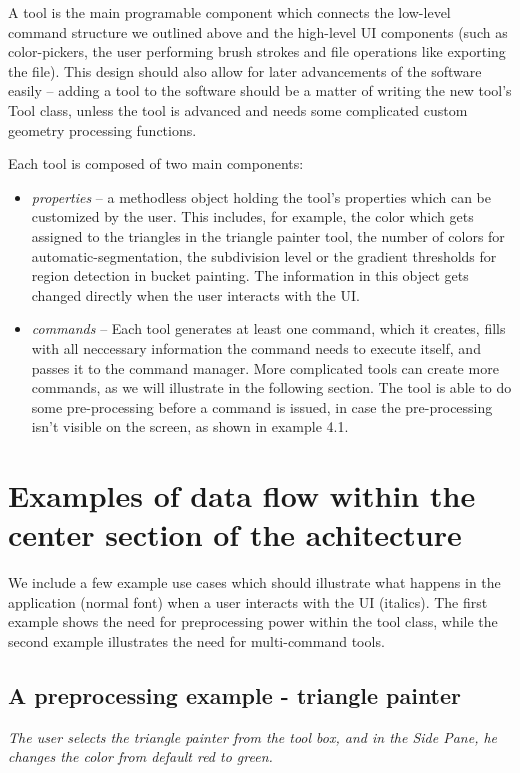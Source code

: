 A tool is the main programable component which connects the low-level command structure we outlined above and the high-level UI components (such as color-pickers, the user performing brush strokes and file operations like exporting the file). This design should also allow for later advancements of the software easily -- adding a tool to the software should be a matter of writing the new tool's Tool class, unless the tool is advanced and needs some complicated custom geometry processing functions.

\medskip

Each tool is composed of two main components:
\begin{itemize}
\item \textit{properties} -- a methodless object holding the tool's properties which can be customized by the user. This includes, for example, the color which gets assigned to the triangles in the triangle painter tool, the number of colors for automatic-segmentation, the subdivision level or the gradient thresholds for region detection in bucket painting. The information in this object gets changed directly when the user interacts with the UI.

\item \textit{commands} -- Each tool generates at least one command, which it creates, fills with all neccessary information the command needs to execute itself, and passes it to the command manager. More complicated tools can create more commands, as we will illustrate in the following section. The tool is able to do some pre-processing before a command is issued, in case the pre-processing isn't visible on the screen, as shown in example 4.1.

\end{itemize}

\section{Examples of data flow within the center section of the achitecture}

We include a few example use cases which should illustrate what happens in the application (normal font) when a user interacts with the UI (italics). The first example shows the need for preprocessing power within the tool class, while the second example illustrates the need for multi-command tools.

\subsection{A preprocessing example - triangle painter}
\textit{The user selects the triangle painter from the tool box, and in the Side Pane, he changes the color from default red to green.}

